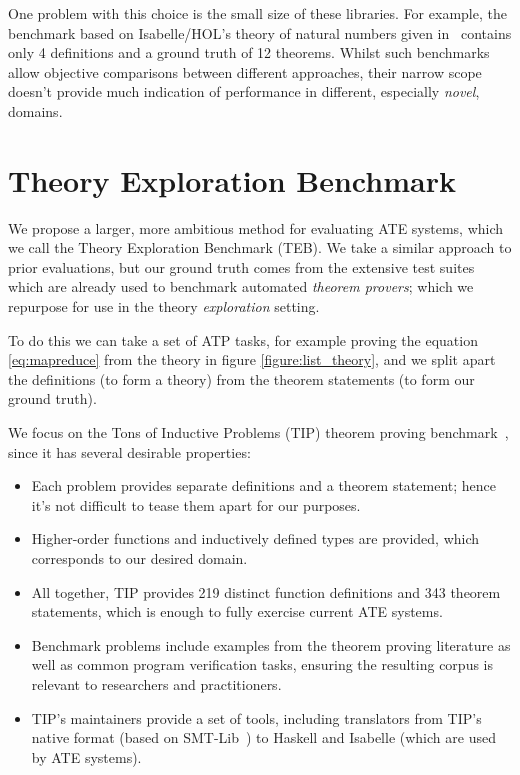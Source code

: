 One problem with this choice is the small size of these libraries. For example,
the benchmark based on Isabelle/HOL's theory of natural numbers given
in~\cite{Johansson.Dixon.Bundy:conjecture-generation} contains only 4
definitions and a ground truth of 12 theorems. Whilst such benchmarks allow
objective comparisons between different approaches, their narrow scope doesn't
provide much indication of performance in different, especially \emph{novel},
domains.

\section{Theory Exploration Benchmark}
\label{sec:proposal}

We propose a larger, more ambitious method for evaluating ATE systems, which we
call the Theory Exploration Benchmark (TEB). We take a similar approach to prior
evaluations, but our ground truth comes from the extensive test suites which are
already used to benchmark automated \emph{theorem provers}; which we repurpose
for use in the theory \emph{exploration} setting.

To do this we can take a set of ATP tasks, for example proving the equation
\ref{eq:mapreduce} from the theory in figure \ref{figure:list_theory}, and we
split apart the definitions (to form a theory) from the theorem statements (to
form our ground truth).

We focus on the Tons of Inductive Problems (TIP) theorem proving
benchmark~\cite{claessen2015tip}, since it has several desirable properties:

\begin{itemize}
\item Each problem provides separate definitions and a theorem statement; hence
  it's not difficult to tease them apart for our purposes.
\item Higher-order functions and inductively defined types are provided, which
  corresponds to our desired domain.
\item All together, TIP provides 219 distinct function definitions and 343
  theorem statements, which is enough to fully exercise current ATE systems.
\item Benchmark problems include examples from the theorem proving literature
  as well as common program verification tasks, ensuring the resulting corpus is
  relevant to researchers and practitioners.
\item TIP's maintainers provide a set of tools, including translators from TIP's
  native format (based on SMT-Lib~\cite{BarFT-SMTLIB}) to Haskell and Isabelle
  (which are used by ATE systems).
\end{itemize}

